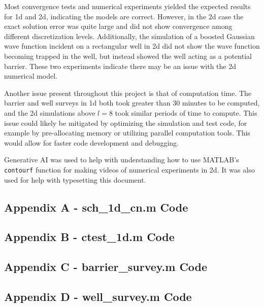\documentclass[10pt]{article}
\def\code#1{\texttt{#1}} %
\begin{document}
Most convergence tests and numerical experiments yielded the expected results for 1d and 
2d, indicating the models are correct. However, in the 2d case the exact solution error was quite large
and did not show convergence among different discretization levels. Additionally, the simulation of a 
boosted Gaussian wave function incident on a rectangular well in 2d did not show the wave function 
becoming trapped in the well, but instead showed the well acting as a potential barrier. These two 
experiments indicate there may be an issue with the 2d numerical model.

Another issue present throughout this project is that of computation time. The barrier and well surveys
in 1d both took greater than 30 minutes to be computed, and the 2d simulations above $l=8$ took similar 
periods of time to compute. This issue could likely be mitigated by optimizing the simulation and test
code, for example by pre-allocating memory or utilizing parallel computation tools. This would allow 
for faster code development and debugging. 

Generative AI was used to help with understanding how to use MATLAB's \code{contourf} function for 
making videos of numerical experiments in 2d. It was also used for help with typesetting this 
document.

\pagebreak


\subsection*{Appendix A - sch\_1d\_cn.m Code}

\pagebreak

\subsection*{Appendix B - ctest\_1d.m Code}

\pagebreak

\subsection*{Appendix C - barrier\_survey.m Code}

\pagebreak

\subsection*{Appendix D - well\_survey.m Code}

\pagebreak
\end{document}

